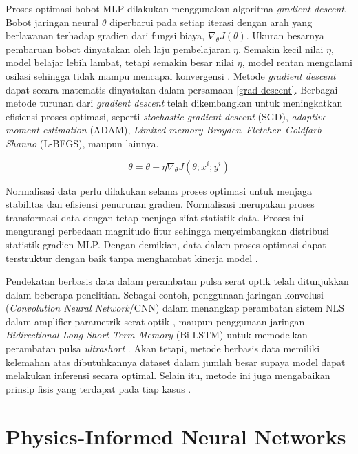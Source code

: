 Proses optimasi bobot MLP dilakukan menggunakan algoritma \emph{gradient descent}. Bobot jaringan neural \(\theta\) diperbarui pada setiap iterasi dengan arah yang berlawanan terhadap gradien dari fungsi biaya, \(\nabla_\theta J(\theta)\). Ukuran besarnya pembaruan bobot dinyatakan oleh laju pembelajaran \(\eta\). Semakin kecil nilai \(\eta\), model belajar lebih lambat, tetapi semakin besar nilai \(\eta\), model rentan mengalami osilasi sehingga tidak mampu mencapai konvergensi . Metode \emph{gradient descent} dapat secara matematis dinyatakan dalam persamaan \eqref{grad-descent}. Berbagai metode turunan dari \emph{gradient descent} telah dikembangkan untuk meningkatkan efisiensi proses optimasi, seperti \emph{stochastic gradient descent} (SGD), \emph{adaptive moment-estimation} (ADAM), \emph{Limited-memory Broyden–Fletcher–Goldfarb–Shanno} (L-BFGS), maupun lainnya. 

\begin{equation}
    \label{grad-descent}
    \theta = \theta-\eta \nabla_\theta J(\theta; x^i;y^i)
\end{equation}

Normalisasi data perlu dilakukan selama proses optimasi untuk menjaga stabilitas dan efisiensi penurunan gradien. Normalisasi merupakan proses transformasi data dengan tetap menjaga sifat statistik data. Proses ini mengurangi perbedaan magnitudo fitur sehingga menyeimbangkan distribusi statistik gradien MLP. Dengan demikian, data dalam proses optimasi dapat terstruktur dengan baik tanpa menghambat kinerja model .

Pendekatan berbasis data dalam perambatan pulsa serat optik telah ditunjukkan dalam beberapa penelitian. Sebagai contoh, penggunaan jaringan konvolusi (\emph{Convolution Neural Network}/CNN) dalam menangkap perambatan sistem NLS dalam amplifier parametrik serat optik , maupun penggunaan jaringan \emph{Bidirectional Long Short-Term Memory} (Bi-LSTM) untuk memodelkan perambatan pulsa \emph{ultrashort} . Akan tetapi, metode berbasis data memiliki kelemahan atas dibutuhkannya dataset dalam jumlah besar supaya model dapat melakukan inferensi secara optimal. Selain itu, metode ini juga mengabaikan prinsip fisis yang terdapat pada tiap kasus .

\section{Physics-Informed Neural Networks}

